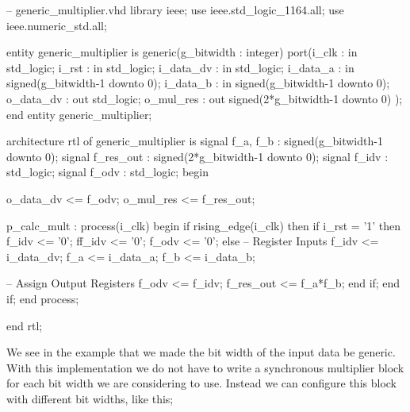\begin{VHDLlisting}[tabsize=4]
-- generic_multiplier.vhd
library ieee;
    use ieee.std_logic_1164.all;
    use ieee.numeric_std.all;
	
entity generic_multiplier is
generic(g_bitwidth : integer)
port(i_clk     : in    std_logic;
     i_rst     : in    std_logic;
     i_data_dv : in    std_logic;
     i_data_a  : in    signed(g_bitwidth-1 downto 0);
     i_data_b  : in    signed(g_bitwidth-1 downto 0);
     o_data_dv :   out std_logic; 
     o_mul_res :   out signed(2*g_bitwidth-1 downto 0)
);
end entity generic_multiplier;

architecture rtl of generic_multiplier is
    signal f_a, f_b  : signed(g_bitwidth-1 downto 0);
    signal f_res_out : signed(2*g_bitwidth-1 downto 0);
    signal f_idv     : std_logic;
    signal f_odv     : std_logic;
begin
    
    o_data_dv <= f_odv;
    o_mul_res <= f_res_out;
    
    p_calc_mult : process(i_clk)
    begin
        if rising_edge(i_clk) then
            if i_rst = '1' then
                f_idv  <= '0';
                ff_idv <= '0';
                f_odv  <= '0';
            else
                -- Register Inputs
                f_idv <= i_data_dv;
                f_a <= i_data_a;
                f_b <= i_data_b;
                			
                -- Assign Output Registers
                f_odv <= f_idv;
                f_res_out <= f_a*f_b;		
            end if;
        end if;	
    end process;
    
end rtl;
	 
\end{VHDLlisting}
	
We see in the example that we made the bit width of the input data be generic. With this implementation we do not have to write a synchronous multiplier block for each bit width we are considering to use. Instead we can configure this block with different bit widths, like this;

